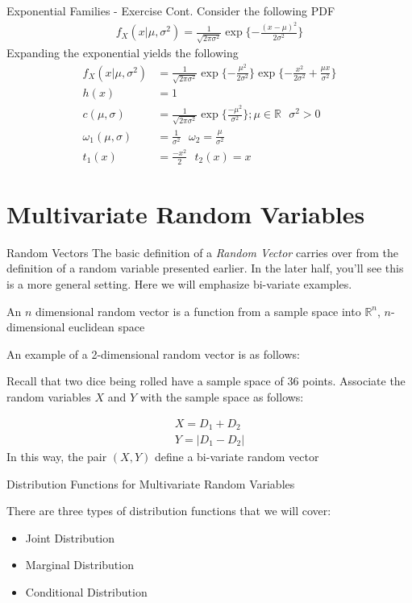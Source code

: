 \documentclass{beamer}
\begin{document}
\begin{frame}{Exponential Families - Exercise Cont.}
Consider the following PDF
\begin{align*}
f_{X}(x|\mu, \sigma^{2}) = \frac{1}{\sqrt{2\pi\sigma^{2}}}\exp\{-\frac{(x-\mu)^{2}}{2\sigma^{2}}\} 
\end{align*}
Expanding the exponential yields the following
\begin{align*}
f_{X}(x|\mu, \sigma^{2}) &= \frac{1}{\sqrt{2\pi\sigma^{2}}}\exp\{-\frac{\mu^{2}}{2\sigma^{2}}\} \exp\{ -\frac{x^{2}}{2\sigma^{2}} + \frac{\mu x}{\sigma^{2}}\}\\
h(x) &= 1\\
c(\mu, \sigma)  &= \frac{1}{\sqrt{2\pi\sigma^{2}}}\exp\{\frac{-\mu^{2}}{\sigma^{2}}\}; \mu\in\mathbb{R}\>\>\>\sigma^{2}>0\\
\omega_{1}(\mu, \sigma) &= \frac{1}{\sigma^{2}}\>\>\>\omega_{2} = \frac{\mu}{\sigma^{2}} \\
t_{1}(x) &= \frac{-x^{2}}{2} \>\>\> t_{2}(x) = x
\end{align*}
\end{frame}

\section{Multivariate Random Variables}
\begin{frame}{Random Vectors}
The basic definition of a \emph{Random Vector} carries over from the definition of a random variable presented earlier. In the later half, you'll see this is a more general setting. Here we will emphasize bi-variate examples.
\begin{center}
An $n$ dimensional random vector is a function from a sample space into $\mathbb{R}^{n}$, $n$-dimensional euclidean space
\end{center}
An example of a 2-dimensional random vector is as follows:
\begin{center}
Recall that two dice being rolled have a sample space of 36 points. Associate the random variables $X$ and $Y$ with the sample space as follows:
\end{center}
\begin{align*}
X = D_{1} + D_{2} \\
Y = |D_{1}-D_{2}|
\end{align*}
In this way, the pair $(X, Y)$ define a bi-variate random vector
\end{frame}

\begin{frame}{Distribution Functions for Multivariate Random Variables}

There are three types of distribution functions that we will cover:
\begin{itemize}
\item{Joint Distribution}
\item{Marginal Distribution}
\item{Conditional Distribution}
\end{itemize}
\end{frame}
\end{document}
